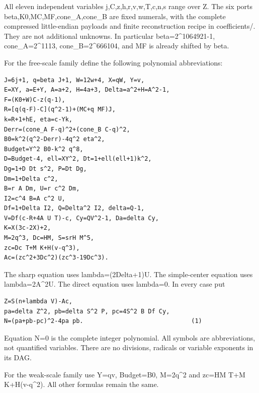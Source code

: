 All eleven independent variables j,C,z,h,r,v,w,T,c,n,s range over Z. The six ports beta,K0,MC,MF,cone\_\allowbreak{}A,cone\_\allowbreak{}B are fixed numerals, with the complete compressed little-endian payloads and finite reconstruction recipe in coefficients/. They are not additional unknowns. In particular beta=\allowbreak{}2\textasciicircum{}\allowbreak{}1064921-1, cone\_\allowbreak{}A=\allowbreak{}2\textasciicircum{}\allowbreak{}1113, cone\_\allowbreak{}B=\allowbreak{}2\textasciicircum{}\allowbreak{}666104, and MF is already shifted by beta.



For the free-scale family define the following polynomial abbreviations:



\begin{verbatim}
J=6j+1, q=beta J+1, W=12w+4, X=qW, Y=v,
E=XY, a=E+Y, A=a+2, H=4a+3, Delta=a^2+H=A^2-1,
F=(K0+W)C-z(q-1),
R=[q(q-F)-C](q^2-1)+(MC+q MF)J,
k=R+1+hE, eta=c-Yk,
Derr=(cone_A F-q)^2+(cone_B C-q)^2,
B0=k^2(q^2-Derr)-4q^2 eta^2,
Budget=Y^2 B0-k^2 q^8,
D=Budget-4, ell=XY^2, Dt=1+ell(ell+1)k^2,
Dg=1+D Dt s^2, P=Dt Dg,
Dm=1+Delta c^2,
B=r A Dm, U=r c^2 Dm,
I2=c^4 B=A c^2 U,
Df=1+Delta I2, Q=Delta^2 I2, delta=Q-1,
V=Df(c-R+4A U T)-c, Cy=QV^2-1, Da=delta Cy,
K=X(3c-2X)+2,
M=2q^3, Dc=HM, S=srH M^5,
zc=Dc T+M K+H(v-q^3),
Ac=(zc^2+3Dc^2)(zc^3-19Dc^3).
\end{verbatim}

The sharp equation uses lambda=\allowbreak{}(2Delta+\allowbreak{}1)U. The simple-center equation uses lambda=\allowbreak{}2A\textasciicircum{}\allowbreak{}2U. The direct equation uses lambda=\allowbreak{}0. In every case put



\begin{verbatim}
Z=S(n+lambda V)-Ac,
pa=delta Z^2, pb=delta S^2 P, pc=4S^2 B Df Cy,
N=(pa+pb-pc)^2-4pa pb.                              (1)
\end{verbatim}

Equation N=\allowbreak{}0 is the complete integer polynomial. All symbols are abbreviations, not quantified variables. There are no divisions, radicals or variable exponents in its DAG.



For the weak-scale family use Y=\allowbreak{}qv, Budget=\allowbreak{}B0, M=\allowbreak{}2q\textasciicircum{}\allowbreak{}2 and zc=\allowbreak{}HM T+\allowbreak{}M K+\allowbreak{}H(v-q\textasciicircum{}\allowbreak{}2). All other formulas remain the same.



